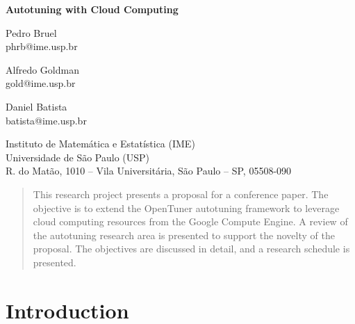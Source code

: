 \documentclass[a4paper, 12pt]{article}
\begin{document}
\hypersetup{backref,pdfpagemode=FullScreen,colorlinks=true}

\thispagestyle{empty}
\begin{center}
    \textbf{\Large{Autotuning with Cloud Computing}}\\

    \vspace*{0.5cm}

    \begin{minipage}{.3\linewidth}
        \begin{flushleft}
            Pedro Bruel\\
            phrb@ime.usp.br
        \end{flushleft}
    \end{minipage}
    \begin{minipage}{.3\linewidth}
        \begin{center}
            Alfredo Goldman\\
            gold@ime.usp.br
        \end{center}
    \end{minipage}
    \begin{minipage}{.3\linewidth}
        \begin{flushright}
            Daniel Batista\\
            batista@ime.usp.br
        \end{flushright}
    \end{minipage}

    \vskip 0.5cm

    \normalsize{Instituto de Matemática e Estatística (IME)\\
                Universidade de São Paulo (USP)\\
                R. do Matão, 1010 – Vila Universitária, São Paulo – SP, 05508-090\\}

\end{center}

\begin{abstract}
This research project presents a proposal for a conference paper.
The objective is to extend the OpenTuner autotuning framework to
leverage cloud computing resources from the Google Compute Engine.
A review of the autotuning research area is presented
to support the novelty of the proposal.
The objectives are discussed in detail, and a research schedule is
presented.
\end{abstract}

\section{Introduction} \label{sec:intro}
\end{document}
